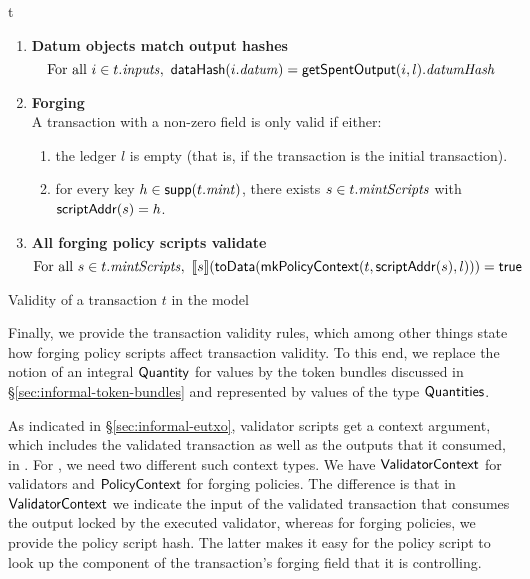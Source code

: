 \begin{ruledfigure}{t}
\begin{enumerate}
\item
  \label{rule:datum-objects-hash}
  \textbf{Datum objects match output hashes}
  \begin{displaymath}
    \textrm{For all } i \in t.\mathit{inputs},\ \mathsf{dataHash}(i.\mathit{datum}) = \mathsf{getSpentOutput}(i, l).\mathit{datumHash}
  \end{displaymath}

\item
  \label{rule:forging}
  \textbf{Forging}\\
  A transaction with a non-zero \mint{} field is only
  valid if either:
  \begin{enumerate}
  \item the ledger $l$ is empty (that is, if the transaction is the initial transaction).
  \item \label{rule:custom-mint}
    for every key $h \in \mathsf{supp}(t.\mathit{mint})$, there
    exists $s \in t.\mathit{mintScripts}$ with
    $\mathsf{scriptAddr}(s) = h$.
  \end{enumerate}
\medskip %
\item
  \label{rule:all-mpss-run}
  \textbf{All forging policy scripts validate}
  \begin{displaymath}
    \textrm{For all } s \in t.\mintScripts,\ \applyMPScript{s}(\toData(\mkMpsContext(t, \scriptAddr(s), l))) = \true
  \end{displaymath}

\end{enumerate}
\caption{Validity of a transaction $t$ in the \EUTXOma{} model}
\label{fig:validity}
\end{ruledfigure}
%
Finally, we provide the transaction validity rules, which among other things state how forging policy scripts affect transaction validity. To this end, we replace the notion of an integral $\textsf{Quantity}$ for values by the token bundles discussed in \S\ref{sec:informal-token-bundles} and represented by values of the type $\textsf{Quantities}$.

As indicated in \S\ref{sec:informal-eutxo}, validator scripts get a context argument, which includes the validated transaction as well as the outputs that it consumed, in \EUTXO. For \EUTXOma, we need two different such context types. We have $\textsf{ValidatorContext}$ for validators and $\textsf{PolicyContext}$ for forging policies. The difference is that in $\textsf{ValidatorContext}$ we indicate the input of the validated transaction that consumes the output locked by the executed validator, whereas for forging policies, we provide the policy script hash. The latter makes it easy for the policy script to look up the component of the transaction's forging field that it is controlling.

